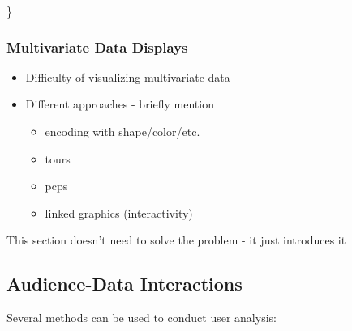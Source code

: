 \documentclass[
]{article}
\providecommand{\tightlist}{%
  \setlength{\itemsep}{0pt}\setlength{\parskip}{0pt}}
\begin{document}
\}

\hypertarget{multivariate-data-displays}{%
\subsubsection{Multivariate Data
Displays}\label{multivariate-data-displays}}

\begin{itemize}
\tightlist
\item
  Difficulty of visualizing multivariate data
\item
  Different approaches - briefly mention

  \begin{itemize}
  \tightlist
  \item
    encoding with shape/color/etc.
  \item
    tours
  \item
    pcps
  \item
    linked graphics (interactivity)
  \end{itemize}
\end{itemize}

This section doesn't need to solve the problem - it just introduces it

\hypertarget{audience-data-interactions}{%
\subsection{Audience-Data
Interactions}\label{audience-data-interactions}}


Several methods can be used to conduct user analysis:
\end{document}
